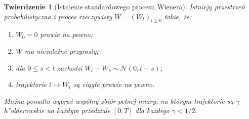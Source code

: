 \documentclass[11pt,a4paper,oneside]{report}
\numberwithin{equation}{chapter}
\theoremstyle{plain}
\newtheorem{twierdzenie}{Twierdzenie}[chapter]
\theoremstyle{definition}
\theoremstyle{remark}
\newcommand{\Normal}{\mathcal{N}}
\begin{document}
\begin{twierdzenie}[Istnienie standardowego procesu Wienera]
\label{thm:wiener-exists}
Istnieją przestrzeń probabilistyczna i proces rzeczywisty
$W=(W_t)_{t\ge0}$ takie, że:
\begin{enumerate}
\item $W_0=0$ prawie na pewno;
\item $W$ ma niezależne przyrosty;
\item dla $0\le s<t$ zachodzi
$W_t-W_s\sim\Normal(0,t-s)$;
\item trajektorie $t\mapsto W_t$ są ciągłe prawie na pewno.
\end{enumerate}
Można ponadto wybrać wspólny zbiór pełnej miary,
na którym trajektorie są $\gamma$-h"olderowskie
na każdym przedziale $[0,T]$ dla każdego $\gamma<1/2$.
\end{twierdzenie}
\end{document}
